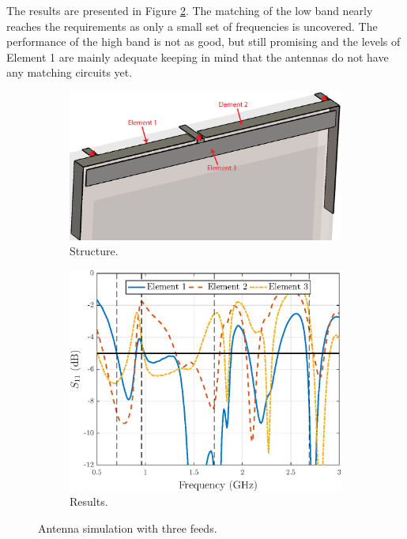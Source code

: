The results are presented in Figure \ref{fig:concept_3feeds_res}. The matching of the low band nearly reaches the requirements as only a small set of frequencies is uncovered. The performance of the high band is not as good, but still promising and the levels of Element 1 are mainly adequate keeping in mind that the antennas do not have any matching circuits yet.
\begin{figure}[H]
    \centering
    \begin{subfigure}[b]{0.49\textwidth}
        \includegraphics[width=\textwidth]{img/concept_3feed_struct.eps}
        \caption{Structure.}
        \label{fig:concept_3feeds_struct}
    \end{subfigure}
    \begin{subfigure}[b]{0.49\textwidth}
        \includegraphics[width=\textwidth]{img/concept_3feeds.eps}
        \caption{Results.}
        \label{fig:concept_3feeds_res}
    \end{subfigure}
    \caption{Antenna simulation with three feeds.}
    \label{fig:concept_3feeds}
\end{figure}



